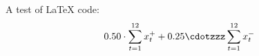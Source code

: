 A test of LaTeX code: \[ 0.50 \cdot \sum_{t = 1}^{12} x_t^+ + 0.25 \cdotzzz \sum_{t = 1}^{12} x_t^- \] 
  
  